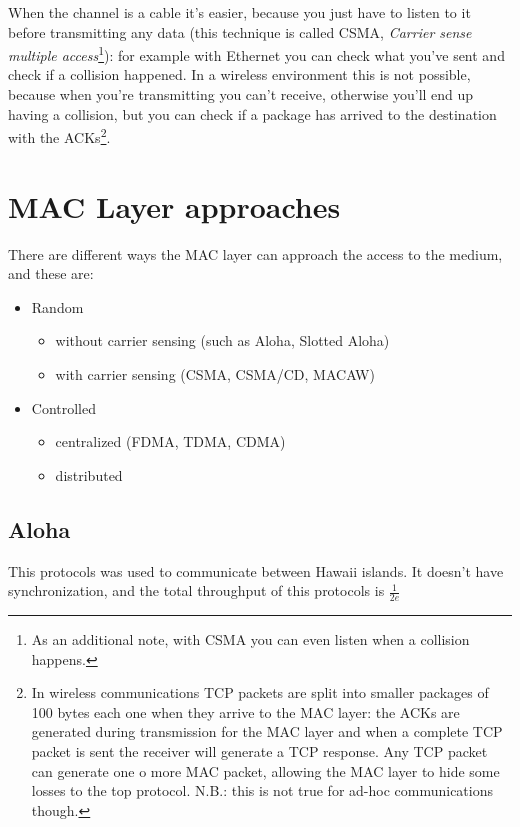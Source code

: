 When the channel is a cable it's easier, because you just have to listen to it
before transmitting any data (this technique is called CSMA, \textit{Carrier
  sense  multiple access}\footnote{As an additional note, with CSMA you can
  even listen  when a collision happens.}): for example with Ethernet you can
check what you've sent and check if a collision happened. In a wireless
environment this is not possible, because when you're transmitting you can't
receive, otherwise you'll end up having a collision, but you can check if a
package has arrived to the destination with the ACKs\footnote{
  In wireless communications TCP packets are split into smaller packages of 100
  bytes each one when they arrive to the MAC layer: the ACKs are generated
  during transmission for the MAC layer and when a complete TCP packet is sent
  the receiver will generate a TCP response. Any TCP packet can generate one o
  more MAC packet, allowing the MAC layer to hide some losses to the top
  protocol. N.B.: this is not true for ad-hoc communications though.
}.

\section{MAC Layer approaches}

There are different ways the MAC layer can approach the access to the medium,
and these are:
\begin{itemize}
\item Random
  \begin{itemize}
  \item without carrier sensing (such as Aloha, Slotted Aloha)
  \item with carrier sensing (CSMA, CSMA/CD, MACAW)
  \end{itemize}
\item Controlled
  \begin{itemize}
  \item centralized (FDMA, TDMA, CDMA)
  \item distributed
  \end{itemize}
\end{itemize}

\subsection{Aloha}

This protocols was used to communicate between Hawaii islands. It doesn't have
synchronization, and the total throughput of this protocols is $\frac{1}{2e}$

